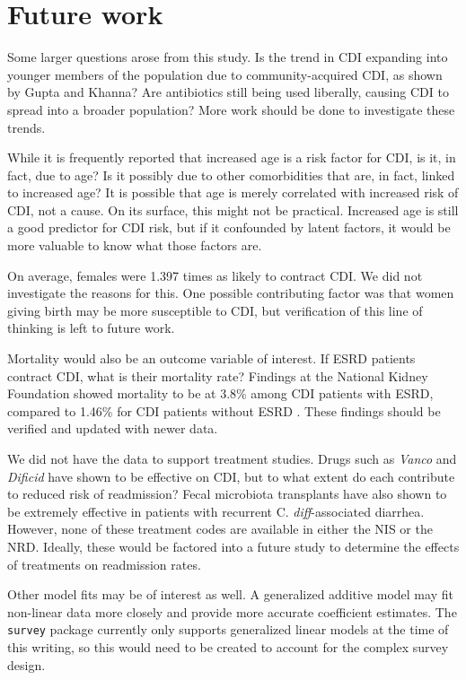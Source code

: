 \documentclass[12pt]{ociamthesis}\usepackage[]{graphicx}\usepackage[]{color}
\newcommand{\cdiff}{C. \textit{diff}}
\begin{document}
\section{Future work}

Some larger questions arose from this study. 
Is the trend in CDI expanding into younger members of the population due
to community-acquired CDI, as shown by Gupta and Khanna? \cite{Gupta2014} Are antibiotics
still being used liberally, causing CDI to spread into a broader population? More 
work should be done to investigate these trends.

While it is frequently reported that increased age is a risk factor for CDI, is it, in fact, 
due to age? Is it possibly due to other comorbidities that are, in fact, linked to increased age?
It is possible that age is merely correlated with increased risk of CDI, not a cause.
On its surface, this might not be practical. Increased age is still a good predictor for CDI risk, 
but if it confounded by latent factors, it would be more valuable to know what those factors are. 

On average, females were 1.397 
times as likely to contract CDI. We did not investigate the
reasons for this. One possible contributing factor was that women giving birth may be more susceptible to CDI, but 
verification of this line of thinking is left to future work.

Mortality would also be an outcome variable of interest. If ESRD patients contract CDI, what is their mortality rate?
Findings at the National Kidney Foundation showed mortality to be at 3.8\% among CDI patients with ESRD, compared to
1.46\% for CDI patients without ESRD \cite{Susman2013}. These findings should be verified and updated with newer data. 

We did not have the data to support treatment studies. Drugs such as \textit{Vanco} and \textit{Dificid} have shown to
be effective on CDI, but to what extent do each contribute to reduced risk of readmission? Fecal microbiota transplants
have also shown to be extremely effective in patients with recurrent \cdiff-associated diarrhea. However, none of these
treatment codes are available in either the NIS or the NRD. Ideally, these would be factored into a future study to
determine the effects of treatments on readmission rates. 

Other model fits may be of interest as well. A generalized additive model may fit non-linear data more closely and
provide more accurate coefficient estimates. The \texttt{survey} package currently only supports generalized linear models
at the time of this writing, so this would need to be created to account for the complex survey design.
\end{document}
